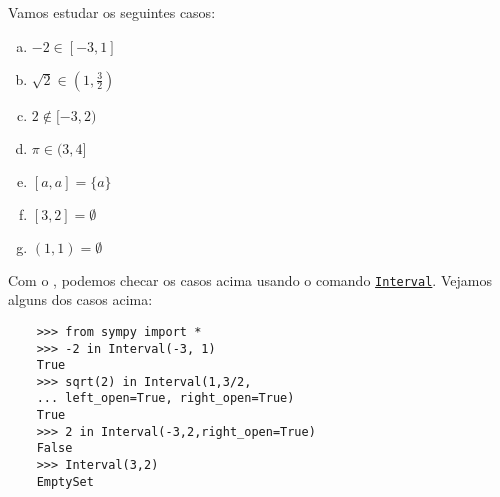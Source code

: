 \begin{ex}
  Vamos estudar os seguintes casos:
  \begin{enumerate}[a)]
  \item $-2\in [-3, 1]$
  \item $\displaystyle \sqrt{2}\in \left(1, \frac{3}{2}\right)$
  \item $2\not\in [-3, 2)$
  \item $\pi\in (3, 4]$
  \item $[a, a] = \{a\}$
  \item $[3, 2]=\emptyset$
  \item $(1, 1)=\emptyset$
  \end{enumerate}
  

  \ifispython
  Com o \sympy, podemos checar os casos acima usando o comando \href{https://docs.sympy.org/latest/modules/sets.html#sympy.sets.sets.Interval}{\lstinline{Interval}}. Vejamos alguns dos casos acima:
  \begin{lstlisting}
    >>> from sympy import *
    >>> -2 in Interval(-3, 1)
    True
    >>> sqrt(2) in Interval(1,3/2,
    ... left_open=True, right_open=True)
    True
    >>> 2 in Interval(-3,2,right_open=True)
    False
    >>> Interval(3,2)
    EmptySet
  \end{lstlisting}
  \fi
\end{ex}

